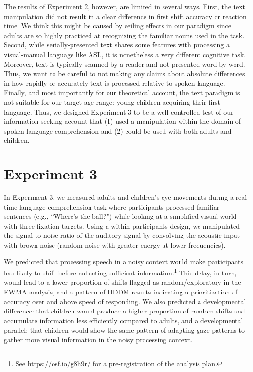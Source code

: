 \documentclass[english,floatsintext,man]{apa6}
\begin{document}
The results of Experiment 2, however, are limited in several ways.
First, the text manipulation did not result in a clear difference in
first shift accuracy or reaction time. We think this might be caused by
ceiling effects in our paradigm since adults are so highly practiced at
recognizing the familiar nouns used in the task. Second, while
serially-presented text shares some features with processing a
visual-manual language like ASL, it is nonetheless a very different
cognitive task. Moreover, text is typically scanned by a reader and not
presented word-by-word. Thus, we want to be careful to not making any
claims about absolute differences in how rapidly or accurately text is
processed relative to spoken language. Finally, and most importantly for
our theoretical account, the text paradigm is not suitable for our
target age range: young children acquiring their first language. Thus,
we designed Experiment 3 to be a well-controlled test of our information
seeking account that (1) used a manipulation within the domain of spoken
language comprehension and (2) could be used with both adults and
children.

\hypertarget{experiment-3}{%
\section{Experiment 3}\label{experiment-3}}

In Experiment 3, we measured adults and children's eye movements during
a real-time language comprehension task where participants processed
familiar sentences (e.g., \enquote{Where's the ball?}) while looking at
a simplified visual world with three fixation targets. Using a
within-participants design, we manipulated the signal-to-noise ratio of
the auditory signal by convolving the acoustic input with brown noise
(random noise with greater energy at lower frequencies).

We predicted that processing speech in a noisy context would make
participants less likely to shift before collecting sufficient
information.\footnote{See \url{https://osf.io/g8h9r/} for a
  pre-registration of the analysis plan.} This delay, in turn, would
lead to a lower proportion of shifts flagged as random/exploratory in
the EWMA analysis, and a pattern of HDDM results indicating a
prioritization of accuracy over and above speed of responding. We also
predicted a developmental difference: that children would produce a
higher proportion of random shifts and accumulate information less
efficiently compared to adults, and a developmental parallel: that
children would show the same pattern of adapting gaze patterns to gather
more visual information in the noisy processing context.
\end{document}
